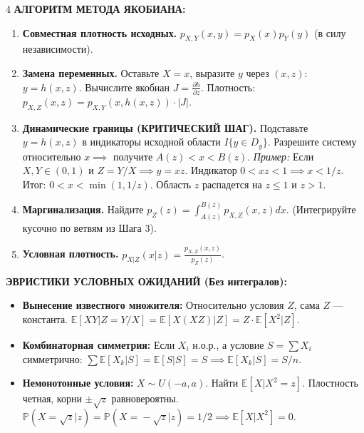 \documentclass[a4paper, landscape]{article}
\newcommand{\E}{\mathbb{E}}
\renewcommand{\P}{\mathbb{P}}
\begin{document}
\begin{multicols*}{4}
\textbf{АЛГОРИТМ МЕТОДА ЯКОБИАНА:}
\begin{enumerate}[label=\textbf{Шаг \arabic*.}, leftmargin=*]
    \item \textbf{Совместная плотность исходных.} $p_{X,Y}(x,y) = p_X(x)p_Y(y)$ (в силу независимости).
    \item \textbf{Замена переменных.} Оставьте $X=x$, выразите $y$ через $(x,z)$: $y = h(x,z)$. Вычислите якобиан $J = \frac{\partial h}{\partial z}$.
    Плотность: $p_{X,Z}(x,z) = p_{X,Y}(x, h(x,z)) \cdot |J|$.
    \item \textbf{Динамические границы (КРИТИЧЕСКИЙ ШАГ).} Подставьте $y = h(x,z)$ в индикаторы исходной области $I\{y \in D_y\}$. Разрешите систему относительно $x \implies$ получите $A(z) < x < B(z)$.
    \textit{Пример:} Если $X,Y \in (0,1)$ и $Z=Y/X \implies y=xz$. Индикатор $0 < xz < 1 \implies x < 1/z$. Итог: $0 < x < \min(1, 1/z)$. Область $z$ распадется на $z \le 1$ и $z > 1$.
    \item \textbf{Маргинализация.} Найдите $p_Z(z) = \int_{A(z)}^{B(z)} p_{X,Z}(x,z) dx$. (Интегрируйте кусочно по ветвям из Шага 3).
    \item \textbf{Условная плотность.} $p_{X|Z}(x|z) = \frac{p_{X,Z}(x,z)}{p_Z(z)}$.
\end{enumerate}

\textbf{ЭВРИСТИКИ УСЛОВНЫХ ОЖИДАНИЙ (Без интегралов):}
\begin{itemize}
    \item \textbf{Вынесение известного множителя:} Относительно условия $Z$, сама $Z$ — константа.
    $\E[XY | Z=Y/X] = \E[X(XZ)|Z] = Z \cdot \E[X^2|Z]$.
    \item \textbf{Комбинаторная симметрия:} Если $X_i$ н.о.р., а условие $S = \sum X_i$ симметрично: $\sum \E[X_k|S] = \E[S|S] = S \implies \E[X_k|S] = S/n$.
    \item \textbf{Немонотонные условия:} $X \sim U(-a,a)$. Найти $\E[X|X^2=z]$. Плостность четная, корни $\pm\sqrt{z}$ равновероятны. $\P(X\!=\!\sqrt{z}|z) = \P(X\!=\!-\sqrt{z}|z) = 1/2 \implies \E[X|X^2] = 0$.
\end{itemize}


\end{multicols*}
\end{document}
